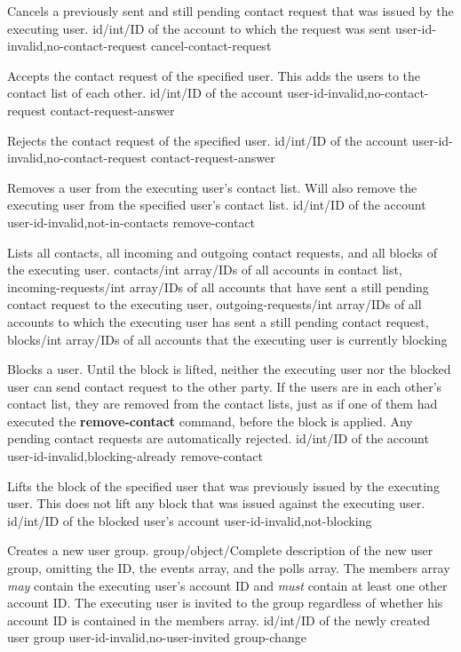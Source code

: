 \documentclass[parskip=full,11pt]{scrartcl}
\begin{document}
{Cancels a previously sent and still pending contact request that was issued
by the executing user.}
{id/int/ID of the account to which the request was sent}
{}
{user-id-invalid,no-contact-request}
{cancel-contact-request}

{Accepts the contact request of the specified user.
This adds the users to the contact list of each other.}
{id/int/ID of the account}
{}
{user-id-invalid,no-contact-request}
{contact-request-answer}

{Rejects the contact request of the specified user.}
{id/int/ID of the account}
{}
{user-id-invalid,no-contact-request}
{contact-request-answer}

{Removes a user from the executing user's contact list.
Will also remove the executing user from the specified user's contact list.}
{id/int/ID of the account}
{}
{user-id-invalid,not-in-contacts}
{remove-contact}

{Lists all contacts, all incoming and outgoing contact requests, and all blocks
of the executing user.}
{}
{contacts/int array/IDs of all accounts in contact list,
incoming-requests/int array/IDs of all accounts that have sent a still pending
contact request to the executing user,
outgoing-requests/int array/IDs of all accounts to which the executing user has
sent a still pending contact request,
blocks/int array/IDs of all accounts that the executing user is currently
blocking}
{}
{}

{Blocks a user.
Until the block is lifted, neither the executing user nor the blocked user can
send contact request to the other party.
If the users are in each other's contact list, they are removed from the
contact lists, just as if one of them had executed the \textbf{remove-contact}
command, before the block is applied.
Any pending contact requests are automatically rejected.}
{id/int/ID of the account}
{}
{user-id-invalid,blocking-already}
{remove-contact}

{Lifts the block of the specified user that was previously issued by the
executing user.
This does not lift any block that was issued against the executing user.}
{id/int/ID of the blocked user's account}
{}
{user-id-invalid,not-blocking}
{}

{Creates a new user group.}
{group/object/Complete description of the new user group{,} omitting the ID{,}
the events array{,} and the polls array.
The members array \textit{may} contain the executing user's account ID and
\textit{must} contain at least one other account ID.
The executing user is invited to the group regardless of whether his account
ID is contained in the members array.}
{id/int/ID of the newly created user group}
{user-id-invalid,no-user-invited}
{group-change}
\end{document}
